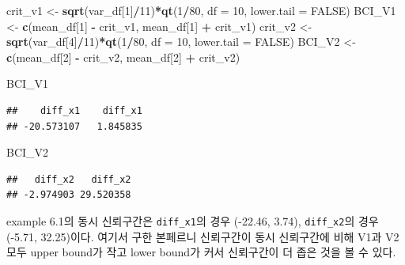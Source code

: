 \documentclass[
]{article}
\newenvironment{Shaded}{\begin{snugshade}}{\end{snugshade}}
\newcommand{\AttributeTok}[1]{\textcolor[rgb]{0.13,0.29,0.53}{#1}}
\newcommand{\ConstantTok}[1]{\textcolor[rgb]{0.56,0.35,0.01}{#1}}
\newcommand{\DecValTok}[1]{\textcolor[rgb]{0.00,0.00,0.81}{#1}}
\newcommand{\FunctionTok}[1]{\textcolor[rgb]{0.13,0.29,0.53}{\textbf{#1}}}
\newcommand{\NormalTok}[1]{#1}
\newcommand{\OtherTok}[1]{\textcolor[rgb]{0.56,0.35,0.01}{#1}}
\newcommand{\SpecialCharTok}[1]{\textcolor[rgb]{0.81,0.36,0.00}{\textbf{#1}}}
\begin{document}
\begin{Shaded}
\begin{Highlighting}[]
\NormalTok{crit\_v1 }\OtherTok{\textless{}{-}} \FunctionTok{sqrt}\NormalTok{(var\_df[}\DecValTok{1}\NormalTok{]}\SpecialCharTok{/}\DecValTok{11}\NormalTok{)}\SpecialCharTok{*}\FunctionTok{qt}\NormalTok{(}\DecValTok{1}\SpecialCharTok{/}\DecValTok{80}\NormalTok{, }\AttributeTok{df =} \DecValTok{10}\NormalTok{, }\AttributeTok{lower.tail =} \ConstantTok{FALSE}\NormalTok{)}
\NormalTok{BCI\_V1 }\OtherTok{\textless{}{-}} \FunctionTok{c}\NormalTok{(mean\_df[}\DecValTok{1}\NormalTok{] }\SpecialCharTok{{-}}\NormalTok{ crit\_v1, mean\_df[}\DecValTok{1}\NormalTok{] }\SpecialCharTok{+}\NormalTok{ crit\_v1)}
\NormalTok{crit\_v2 }\OtherTok{\textless{}{-}} \FunctionTok{sqrt}\NormalTok{(var\_df[}\DecValTok{4}\NormalTok{]}\SpecialCharTok{/}\DecValTok{11}\NormalTok{)}\SpecialCharTok{*}\FunctionTok{qt}\NormalTok{(}\DecValTok{1}\SpecialCharTok{/}\DecValTok{80}\NormalTok{, }\AttributeTok{df =} \DecValTok{10}\NormalTok{, }\AttributeTok{lower.tail =} \ConstantTok{FALSE}\NormalTok{)}
\NormalTok{BCI\_V2 }\OtherTok{\textless{}{-}} \FunctionTok{c}\NormalTok{(mean\_df[}\DecValTok{2}\NormalTok{] }\SpecialCharTok{{-}}\NormalTok{ crit\_v2, mean\_df[}\DecValTok{2}\NormalTok{] }\SpecialCharTok{+}\NormalTok{ crit\_v2)}
\end{Highlighting}
\end{Shaded}

\begin{Shaded}
\begin{Highlighting}[]
\NormalTok{BCI\_V1}
\end{Highlighting}
\end{Shaded}

\begin{verbatim}
##    diff_x1    diff_x1 
## -20.573107   1.845835
\end{verbatim}

\begin{Shaded}
\begin{Highlighting}[]
\NormalTok{BCI\_V2}
\end{Highlighting}
\end{Shaded}

\begin{verbatim}
##   diff_x2   diff_x2 
## -2.974903 29.520358
\end{verbatim}

example 6.1의 동시 신뢰구간은 \texttt{diff\_x1}의 경우 (-22.46, 3.74),
\texttt{diff\_x2}의 경우 (-5.71, 32.25)이다. 여기서 구한 본페르니
신뢰구간이 동시 신뢰구간에 비해 V1과 V2 모두 upper bound가 작고 lower
bound가 커서 신뢰구간이 더 좁은 것을 볼 수 있다.
\end{document}
